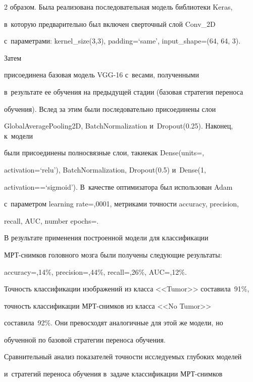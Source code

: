 \begin{multicols}{2}
образом. Была реализована последовательная модель библиотеки Keras, 

в~которую предварительно был включен сверточный слой Conv\_2D 

с~параметрами: \mbox{kernel\_size(3,3)}, padding\;=\;`same', input\_shape\;=\;(64, 64, 3). 

Затем %

присоединена базовая модель VGG-16 с~весами, полученными 

в~результате ее обучения на предыду\-щей стадии (базовая стратегия переноса 

обучения). Вслед за этим были последовательно присоединены слои 

\mbox{GlobalAveragePooling2D}, BatchNormalization и~Dropout(0.25). Наконец, к~модели 

были присоединены полносвязные слои, такие\linebreak как Dense(units\;=, 

activation\;=\;`relu'), BatchNormalization, Dropout(0.5) и~Dense(1, 

activation\;=\linebreak =\;`sigmoid'). В~качестве оптимизатора был использован Adam 

с~па\-ра\-мет\-ром learning rate\;=,0001, мет\-ри\-ка\-ми точ\-ности accuracy, precision, 

recall, AUC, number epochs\;=. 

  

  В результате применения построенной модели для классификации 

МРТ-снимков головного мозга были получены следующие результаты: 

accuracy\;=,14\%, precision\;=,44\%, recall\;=,26\%, AUC\;=,12\%. 

Точность классификации изображений из класса <<Tumor>> составила~91\%, 

точность классификации МРТ-сним\-ков из класса <<No Tumor>> 

составила~92\%. Они превосходят аналогичные для этой же модели, но 

обученной по базовой стратегии переноса обучения. 

  

  Сравнительный анализ показателей точности исследуемых глубоких моделей 

  и~стратегий переноса обучения в~задаче классификации МРТ-сним\-ков 


\end{multicols}
